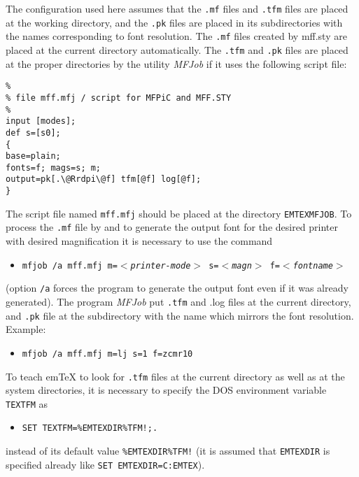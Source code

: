 The configuration used here assumes that the {\tt .mf} files
and {\tt .tfm} files are placed at the working directory, and
the {\tt .pk} files are placed in its subdirectories with the names
corresponding to font resolution. The {\tt .mf} files created
by {\sc mff.sty} are placed at the current directory automatically.
The {\tt .tfm} and {\tt .pk} files are placed at the proper directories
by the utility {\sl MFJob} if it uses the following script file:
\begin{verbatim}
%
% file mff.mfj / script for MFPiC and MFF.STY
%
input [modes];
def s=[s0];
{
base=plain;
fonts=f; mags=s; m;
output=pk[.\@Rrdpi\@f] tfm[@f] log[@f];
}
\end{verbatim}
The script file named {\tt mff.mfj} should be placed at the directory
{\tt\bs{}EMTEX\bs{}MFJOB\bs}.
To process the {\tt .mf} file by \MF{} and to generate the output font
for the desired printer with desired magnification it is necessary
to use the command
\begin{itemize}
\item[]\tt mfjob /a mff.mfj m=$<${\em printer-mode}$>$
                            s=$<${\em magn}$>$
                            f=$<${\em fontname}$>$
\end{itemize}
(option {\tt /a} forces the program to generate the output font even if
it was already generated). The program {\sl MFJob} put {\tt .tfm}
and {.log} files at the current directory, and {\tt .pk} file at
the subdirectory with the name which mirrors the font resolution.
Example:
\begin{itemize}
\item[]\tt mfjob /a mff.mfj m=lj s=1 f=zcmr10
\end{itemize}

To teach {\sf em\TeX} to look for {\tt .tfm} files at the current
directory as well as at the system directories, it is necessary
to specify the DOS environment variable {\tt TEXTFM} as
\begin{itemize}
\item[]\tt SET TEXTFM=\%EMTEXDIR\%\bs{}TFM!;.\bs
\end{itemize}
instead of its default value {\tt \%EMTEXDIR\%\bs{}TFM!}
(it is assumed that {\tt EMTEXDIR}
is specified already like {\tt SET EMTEXDIR=C:\bs{}EMTEX}).

